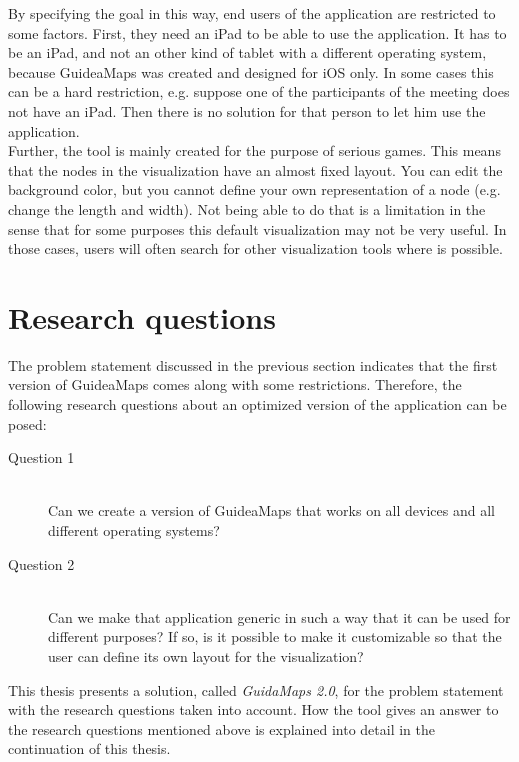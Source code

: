 By specifying the goal in this way, end users of the application are restricted to some factors. First, they need an iPad to be able to use the application. It has to be an iPad, and not an other kind of tablet with a different operating system, because GuideaMaps was created and designed for iOS only. In some cases this can be a hard restriction, e.g. suppose one of the participants of the meeting does not have an iPad. Then there is no solution for that person to let him use the application. \\

Further, the tool is mainly created for the purpose of serious games. This means that the nodes in the visualization have an almost fixed layout. You can edit the background color, but you cannot define your own representation of a node (e.g. change the length and width). Not being able to do that is a limitation in the sense that for some purposes this default visualization may not be very useful. In those cases, users will often search for other visualization tools where is possible.

\section{Research questions}\label{sec:research-questions}
The problem statement discussed in the previous section indicates that the first version of GuideaMaps comes along with some restrictions. Therefore, the following research questions about an optimized version of the application can be posed:

\begin{description}
	\item[Question 1] \hfill \\
	Can we create a version of GuideaMaps that works on all devices and all different operating systems?
	
	\item[Question 2] \hfill \\
	Can we make that application generic in such a way that it can be used for different purposes?
	If so, is it possible to make it customizable so that the user can define its own layout for the visualization?
\end{description}

This thesis presents a solution, called \textit{GuidaMaps 2.0}, for the problem statement with the research questions taken into account. How the tool gives an answer to the research questions mentioned above is explained into detail in the continuation of this thesis.